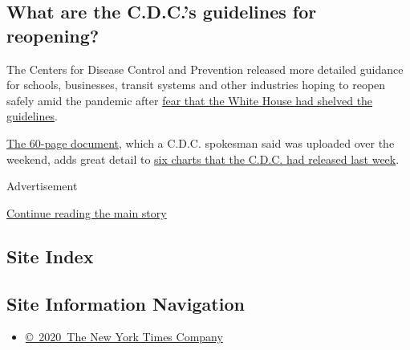 \hypertarget{what-are-the-cdcs-guidelines-for-reopening}{%
\subsection{What are the C.D.C.'s guidelines for
reopening?}\label{what-are-the-cdcs-guidelines-for-reopening}}

The Centers for Disease Control and Prevention released more detailed
guidance for schools, businesses, transit systems and other industries
hoping to reopen safely amid the pandemic after
\href{https://www.nytimes3xbfgragh.onion/2020/05/07/us/politics/trump-cdc.html}{fear
that the White House had shelved the guidelines}.

\href{https://www.cdc.gov/coronavirus/2019-ncov/downloads/php/CDC-Activities-Initiatives-for-COVID-19-Response.pdf}{The
60-page document}, which a C.D.C. spokesman said was uploaded over the
weekend, adds great detail to
\href{https://www.nytimes3xbfgragh.onion/2020/05/15/us/cdc-coronavirus-checklists-decision-trees.html}{six
charts that the C.D.C. had released last week}.

Advertisement

\protect\hyperlink{after-bottom}{Continue reading the main story}

\hypertarget{site-index}{%
\subsection{Site Index}\label{site-index}}

\hypertarget{site-information-navigation}{%
\subsection{Site Information
Navigation}\label{site-information-navigation}}

\begin{itemize}
\tightlist
\item
  \href{https://help.nytimes3xbfgragh.onion/hc/en-us/articles/115014792127-Copyright-notice}{©~2020~The
  New York Times Company}
\end{itemize}


